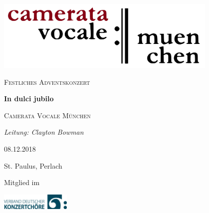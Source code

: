 \documentclass[11pt, ngermanm, titlepage]{article}
\begin{document}
	\begin{titlepage}
	\centering
	\includegraphics[width=0.8\textwidth]{img/cvlogo.png}\par\vspace{2cm}
	
	{\scshape\Large Festliches Adventskonzert\par}
	\vspace{1.5cm}
	{\fontsize{50}{60}\bfseries\jubilo In dulci jubilo\par}
	\vspace{1.5cm}
	{\scshape\LARGE Camerata Vocale München\par}
	\vspace{1cm}
	{\Large\itshape Leitung: Clayton Bowman\par}
	\vfill
	08.12.2018\par
	St. Paulus, Perlach
	
	\vfill
	
	{\scriptsize Mitglied im\par}
	\includegraphics[width=0.25\textwidth]{img/vdkc_logo_klein.jpg}\par\vspace{2cm}


	\end{titlepage}

	\pagebreak

	
\end{document}
